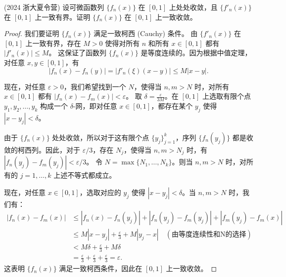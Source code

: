 \documentclass[lang=cn,10pt,thmcnt=section]{elegantbook}
\begin{document}
	\begin{example}
	(2024 浙大夏令营) 设可微函数列 $\{f_n(x)\}$ 在 $[0,1]$ 上处处收敛，且 $\{f'_n(x)\}$ 在 $[0,1]$ 上一致有界。证明 $\{f_n(x)\}$ 在 $[0,1]$ 上一致收敛。
	\end{example}
	\begin{proof}
		我们要证明 $\{f_n(x)\}$ 满足一致柯西 (Cauchy) 条件。
		由 $\{f'_n(x)\}$ 在 $[0,1]$ 上一致有界，存在 $M > 0$ 使得对所有 $n$ 和所有 $x \in [0,1]$ 都有 $|f'_n(x)| \le M$。
		这保证了函数列 $\{f_n(x)\}$ 是等度连续的。因为根据中值定理，对任意 $x,y \in [0,1]$，有
		\[ |f_n(x) - f_n(y)| = |f'_n(\xi)(x-y)| \le M|x-y|. \]
		
		现在，对任意 $\varepsilon > 0$，我们希望找到一个 $N$，使得当 $n,m > N$ 时，对所有 $x \in [0,1]$ 都有 $|f_n(x) - f_m(x)| < \varepsilon$。
		取 $\delta = \frac{\varepsilon}{3M}$。在 $[0,1]$ 上选取有限个点 $y_1, y_2, \dots, y_k$ 构成一个 $\delta$-网，即对任意 $x \in [0,1]$，都存在某个 $y_j$ 使得 $|x-y_j| < \delta$。
		
		由于 $\{f_n(x)\}$ 处处收敛，所以对于这有限个点 $\{y_j\}_{j=1}^k$，序列 $\{f_n(y_j)\}$ 都是收敛的柯西列。因此，对于 $\varepsilon/3$，存在 $N_j$，使得当 $n,m > N_j$ 时，有 $|f_n(y_j) - f_m(y_j)| < \varepsilon/3$。
		令 $N = \max\{N_1, \dots, N_k\}$。则当 $n,m > N$ 时，对所有的 $j=1,\dots,k$ 上述不等式都成立。
		
		现在，对任意 $x \in [0,1]$，选取对应的 $y_j$ 使得 $|x-y_j|<\delta$。当 $n,m > N$ 时，我们有：
		\begin{align*}
			|f_n(x) - f_m(x)| &\le |f_n(x) - f_n(y_j)| + |f_n(y_j) - f_m(y_j)| + |f_m(y_j) - f_m(x)| \\
			&\le M|x-y_j| + \frac{\varepsilon}{3} + M|y_j-x| \quad (\text{由等度连续性和N的选择}) \\
			&< M\delta + \frac{\varepsilon}{3} + M\delta \\
			&= \frac{\varepsilon}{3} + \frac{\varepsilon}{3} + \frac{\varepsilon}{3} = \varepsilon.
		\end{align*}
		这表明 $\{f_n(x)\}$ 满足一致柯西条件，因此在 $[0,1]$ 上一致收敛。
	\end{proof}
	
\end{document}
